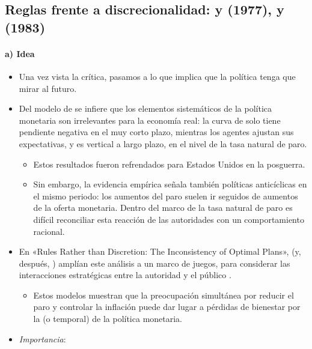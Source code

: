 \documentclass[11pt]{article}
\begin{document}
\subsection{Reglas frente a discrecionalidad:\cortetitulo{}  y  (1977),  y  (1983)}\label{sec:kydland-prescott}

\paragraph{a) Idea}

\begin{itemize}
\item Una vez vista la crítica, pasamos a lo que implica que la política tenga que mirar al futuro.
\item Del modelo de \textcite{Lucas1972Expectations} se infiere que los elementos sistemáticos de la política monetaria son irrelevantes para la economía real: la curva de  solo tiene pendiente negativa en el muy corto plazo, mientras los agentes ajustan sus expectativas, y es vertical a largo plazo, en el nivel de la tasa natural de paro.
  \begin{itemize}
  \item Estos resultados fueron refrendados para Estados Unidos en la posguerra\nocite{Barro1977Unanticipated}.
  \item Sin embargo, la evidencia empírica señala también políticas anticíclicas en el mismo periodo: los aumentos del paro suelen ir seguidos de aumentos de la oferta monetaria. Dentro del marco de la tasa natural de paro es difícil reconciliar esta reacción de las autoridades con un comportamiento racional.
  \end{itemize}
\item En «Rules Rather than Discretion: The Inconsistency of Optimal Plans», \textcite{KydlandPrescott1977Rules} (y, después, \textcite{BarroGordon1983Positive}) amplían este análisis a un marco de juegos, para considerar las interacciones estratégicas entre la autoridad y el público .
  \begin{itemize}
  \item Estos modelos muestran que la preocupación simultánea por reducir el paro y controlar la inflación puede dar lugar a pérdidas de bienestar por la  (o temporal) de la política monetaria.
  \end{itemize}
\item \emph{Importancia}:
  \begin{itemize}

\end{itemize}
\end{itemize}
\end{document}
